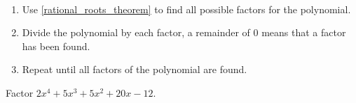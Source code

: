 \documentclass[notes]{subfiles}
\begin{document}
\begin{procedure}
    ~

    \begin{enumerate}[label = (\arabic*)]
        \item Use \cref{rational_roots_theorem} to find all possible factors for the polynomial.
        \item Divide the polynomial by each factor, a remainder of $0$ means that a factor has been found.
        \item Repeat until all factors of the polynomial are found.
    \end{enumerate}
\end{procedure}

\begin{exercise}
    Factor $2x^4 + 5x^3 + 5x^2 + 20x - 12$.
\end{exercise}
\end{document}
